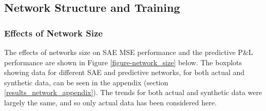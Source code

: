 \documentclass[a4paper,11pt,oneside]{article}
\theoremstyle{plain}
\theoremstyle{definition}
\begin{document}
\newpage
{}
\newpage

\subsection{Network Structure and Training}\label{results_network}

\subsubsection{Effects of Network Size}

The effects of networks size on SAE MSE performance and the predictive P\&L performance are shown in Figure \ref{figure-network_size} below. The boxplots showing data for different SAE and predictive networks, for both actual and synthetic data, can be seen in the appendix (section \ref{results_network_appendix}). The trends for both actual and synthetic data were largely the same, and so only actual data has been considered here.
\end{document}
